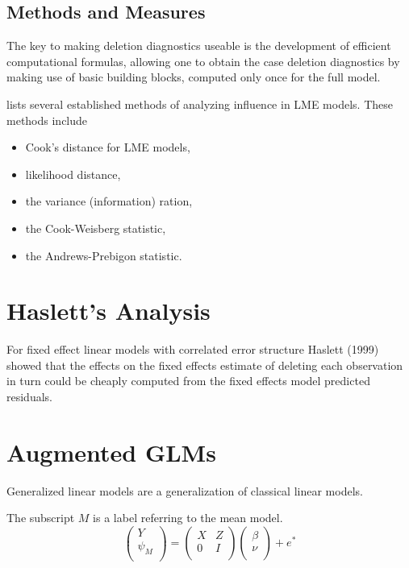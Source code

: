 \documentclass[12pt, a4paper]{report}
\theoremstyle{plain}
\theoremstyle{definition}
\theoremstyle{remark}
\begin{document}
\subsection{Methods and Measures}
The key to making deletion diagnostics useable is the development of efficient
computational formulas, allowing one to obtain the  case deletion diagnostics by
making use of basic building blocks, computed only once for the full model.

\citet{Zewotir} lists several established methods of analyzing influence in LME models. These methods include \begin{itemize}
	\item Cook's distance for LME models,
	\item {} likelihood distance,
	\item the variance (information) ration,
	\item the  Cook-Weisberg statistic,
	\item the  Andrews-Prebigon statistic.
\end{itemize}






\section{Haslett's Analysis} %
For fixed effect linear models with correlated error structure Haslett (1999) showed that the effects on
the fixed effects estimate of deleting each observation in turn could be cheaply computed from the fixed effects model predicted residuals.



\newpage
\section{Augmented GLMs} %


Generalized linear models are a generalization of classical linear
models.

The subscript $M$ is a label referring to the mean model.
\begin{equation}
\left(%
\begin{array}{c}
Y \\
\psi_{M} \\
\end{array}%
\right) = \left(
\begin{array}{cc}
X & Z \\
0 & I \\
\end{array}\right) \left(%
\begin{array}{c}
\beta \\
\nu \\
\end{array}%
\right)+ e^{*}
\end{equation}
\end{document}
